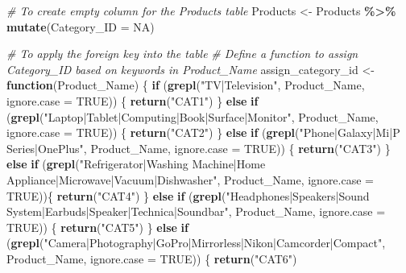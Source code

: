 \documentclass[
]{article}
\newenvironment{Shaded}{\begin{snugshade}}{\end{snugshade}}
\newcommand{\AttributeTok}[1]{\textcolor[rgb]{0.13,0.29,0.53}{#1}}
\newcommand{\CommentTok}[1]{\textcolor[rgb]{0.56,0.35,0.01}{\textit{#1}}}
\newcommand{\ConstantTok}[1]{\textcolor[rgb]{0.56,0.35,0.01}{#1}}
\newcommand{\ControlFlowTok}[1]{\textcolor[rgb]{0.13,0.29,0.53}{\textbf{#1}}}
\newcommand{\FunctionTok}[1]{\textcolor[rgb]{0.13,0.29,0.53}{\textbf{#1}}}
\newcommand{\NormalTok}[1]{#1}
\newcommand{\OtherTok}[1]{\textcolor[rgb]{0.56,0.35,0.01}{#1}}
\newcommand{\SpecialCharTok}[1]{\textcolor[rgb]{0.81,0.36,0.00}{\textbf{#1}}}
\newcommand{\StringTok}[1]{\textcolor[rgb]{0.31,0.60,0.02}{#1}}
\begin{document}
\begin{Shaded}
\begin{Highlighting}[]
\CommentTok{\# To create empty column for the Products table }
\NormalTok{Products }\OtherTok{\textless{}{-}}\NormalTok{ Products }\SpecialCharTok{\%\textgreater{}\%}
  \FunctionTok{mutate}\NormalTok{(}\AttributeTok{Category\_ID =} \ConstantTok{NA}\NormalTok{)}

\CommentTok{\# To apply the foreign key into the table }
\CommentTok{\# Define a function to assign Category\_ID based on keywords in Product\_Name}
\NormalTok{assign\_category\_id }\OtherTok{\textless{}{-}} \ControlFlowTok{function}\NormalTok{(Product\_Name) \{}
  \ControlFlowTok{if}\NormalTok{ (}\FunctionTok{grepl}\NormalTok{(}\StringTok{"TV|Television"}\NormalTok{, Product\_Name, }\AttributeTok{ignore.case =} \ConstantTok{TRUE}\NormalTok{)) \{}
    \FunctionTok{return}\NormalTok{(}\StringTok{"CAT1"}\NormalTok{)}
\NormalTok{  \} }\ControlFlowTok{else} \ControlFlowTok{if}\NormalTok{ (}\FunctionTok{grepl}\NormalTok{(}\StringTok{"Laptop|Tablet|Computing|Book|Surface|Monitor"}\NormalTok{, Product\_Name, }\AttributeTok{ignore.case =} \ConstantTok{TRUE}\NormalTok{)) \{}
    \FunctionTok{return}\NormalTok{(}\StringTok{"CAT2"}\NormalTok{)}
\NormalTok{  \} }\ControlFlowTok{else} \ControlFlowTok{if}\NormalTok{ (}\FunctionTok{grepl}\NormalTok{(}\StringTok{"Phone|Galaxy|Mi|P Series|OnePlus"}\NormalTok{, Product\_Name, }\AttributeTok{ignore.case =} \ConstantTok{TRUE}\NormalTok{)) \{}
    \FunctionTok{return}\NormalTok{(}\StringTok{"CAT3"}\NormalTok{)}
\NormalTok{  \} }\ControlFlowTok{else} \ControlFlowTok{if}\NormalTok{ (}\FunctionTok{grepl}\NormalTok{(}\StringTok{"Refrigerator|Washing Machine|Home Appliance|Microwave|Vacuum|Dishwasher"}\NormalTok{, Product\_Name, }\AttributeTok{ignore.case =} \ConstantTok{TRUE}\NormalTok{))\{}
    \FunctionTok{return}\NormalTok{(}\StringTok{"CAT4"}\NormalTok{)}
\NormalTok{  \} }\ControlFlowTok{else} \ControlFlowTok{if}\NormalTok{ (}\FunctionTok{grepl}\NormalTok{(}\StringTok{"Headphones|Speakers|Sound System|Earbuds|Speaker|Technica|Soundbar"}\NormalTok{, Product\_Name, }\AttributeTok{ignore.case =} \ConstantTok{TRUE}\NormalTok{)) \{}
    \FunctionTok{return}\NormalTok{(}\StringTok{"CAT5"}\NormalTok{)}
\NormalTok{  \} }\ControlFlowTok{else} \ControlFlowTok{if}\NormalTok{ (}\FunctionTok{grepl}\NormalTok{(}\StringTok{"Camera|Photography|GoPro|Mirrorless|Nikon|Camcorder|Compact"}\NormalTok{, Product\_Name, }\AttributeTok{ignore.case =} \ConstantTok{TRUE}\NormalTok{)) \{}
    \FunctionTok{return}\NormalTok{(}\StringTok{"CAT6"}\NormalTok{)}

\end{Highlighting}
\end{Shaded}
\end{document}
